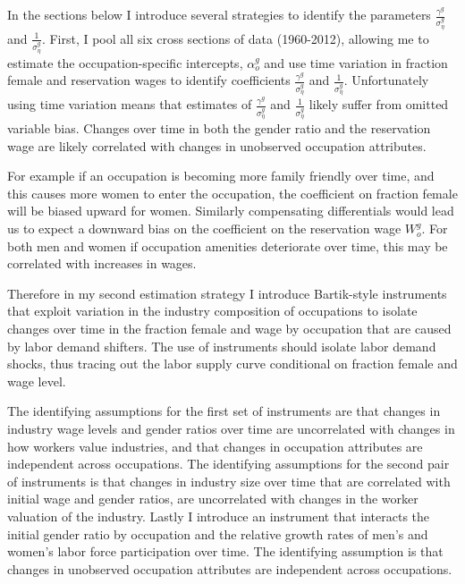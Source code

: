 \documentclass[11pt]{article}
\begin{document}
In the sections below I introduce several strategies to identify the parameters $\frac{\gamma^g}{\sigma^g_{\eta}}$ and $\frac{1}{\sigma^g_{\eta}}$. First, I pool all six cross sections of data (1960-2012), allowing me to estimate the occupation-specific intercepts, $\alpha^g_o$ and use time variation in fraction female and reservation wages to identify coefficients $\frac{\gamma^g}{\sigma^g_{\eta}}$ and $\frac{1}{\sigma^g_{\eta}}$. Unfortunately using time variation means that estimates of $\frac{\gamma^g}{\sigma^g_{\eta}}$ and $\frac{1}{\sigma^g_{\eta}}$ likely suffer from omitted variable bias. Changes over time in both the gender ratio and the reservation wage are likely correlated with changes in unobserved occupation attributes. 

For example if an occupation is becoming more family friendly over time, and this causes more women to enter the occupation, the coefficient on fraction female will be biased upward for women. Similarly compensating differentials would lead us to expect a downward bias on the coefficient on the reservation wage $W^g_o$. For both men and women if occupation amenities deteriorate over time, this may be correlated with increases in wages.

Therefore in my second estimation strategy I introduce Bartik-style instruments that exploit variation in the industry composition of occupations to isolate changes over time in the fraction female and wage by occupation that are caused by labor demand shifters. The use of instruments should isolate labor demand shocks, thus tracing out the labor supply curve conditional on fraction female and wage level. 

The identifying assumptions for the first set of instruments are that changes in industry wage levels and gender ratios over time are uncorrelated with changes in how workers value industries, and that changes in occupation attributes are independent across occupations. The identifying assumptions for the second pair of instruments is that changes in industry size over time that are correlated with initial wage and gender ratios, are uncorrelated with changes in the worker valuation of the industry. Lastly I introduce an instrument that interacts the initial gender ratio by occupation and the relative growth rates of men's and women's labor force participation over time. The identifying assumption is that changes in unobserved occupation attributes are independent across occupations.

 
\end{document}
